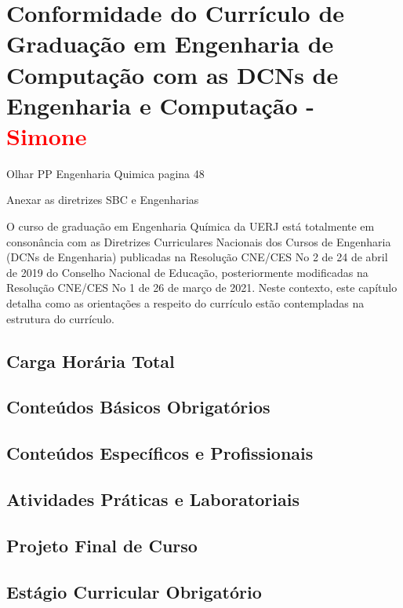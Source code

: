 \chapter{Conformidade do Currículo de Graduação em Engenharia de Computação
com as DCNs de Engenharia e Computação - \textcolor{red}{Simone}}

Olhar PP Engenharia Quimica pagina 48

Anexar as diretrizes SBC e Engenharias

O curso de graduação em Engenharia Química da UERJ está totalmente em
consonância com as Diretrizes Curriculares Nacionais dos Cursos de Engenharia (DCNs
de Engenharia) publicadas na Resolução CNE/CES No 2 de 24 de abril de 2019 do
Conselho Nacional de Educação, posteriormente modificadas na Resolução CNE/CES No
1 de 26 de março de 2021. Neste contexto, este capítulo detalha como as orientações a
respeito do currículo estão contempladas na estrutura do currículo.

\section{Carga Horária Total}

\section{Conteúdos Básicos Obrigatórios}

\section{Conteúdos Específicos e Profissionais}

\section{Atividades Práticas e Laboratoriais}

\section{Projeto Final de Curso}

\section{Estágio Curricular Obrigatório}